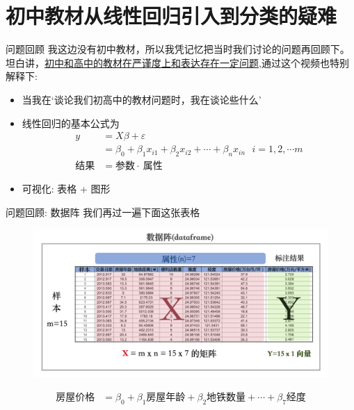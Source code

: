 \documentclass[handout]{ctexbeamer}
\begin{document}
\section{初中教材从线性回归引入到分类的疑难}


\begin{frame}{问题回顾}
	我这边没有初中教材，所以我凭记忆把当时我们讨论的问题再回顾下。坦白讲，\underline{初中和高中的教材在严谨度上和表达存在一定问题},通过这个视频也特别解释下:
	\begin{itemize}
	\setlength\itemsep{0.6em}
		\item 当我在`谈论我们初高中的教材问题时，我在谈论些什么’
		\item 线性回归的基本公式为 \begin{align*}
			y & = X\beta + \varepsilon \\
			  & = \beta_0 + \beta_1 x_{i1} + \beta_2 x_{i2} + \cdots + \beta_n x_{in} \ \ \ i = 1, 2, \cdots m \\
			  \text{结果} & = \text{参数} \cdot \ \text{属性} 
		\end{align*}
		\item 可视化: 表格 + 图形 
	\end{itemize}
\end{frame}


\begin{frame}{问题回顾: 数据阵}
我们再过一遍下面这张表格
\begin{figure}[H]
	\centering
	\includegraphics[width=\textwidth]{fig/dataframeVis}
\end{figure}
\begin{align*}
	\text{房屋价格} & = \beta_0 + \beta_1  \text{房屋年龄} + \beta_2 \text{地铁数量} + \cdots + \beta_7 \text{经度} 
\end{align*}
\end{frame}
\end{document}

